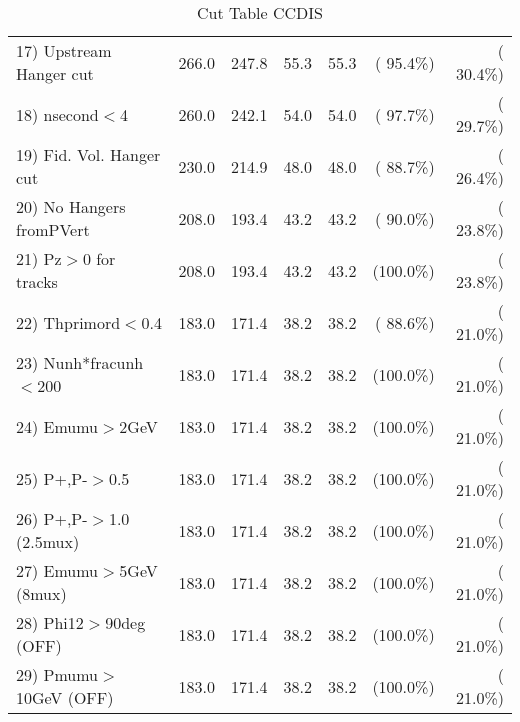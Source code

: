 \begin{table}[h!]
\begin{tabular}{||l||r|r|r|r|r|r||}
 17) Upstream Hanger cut  &        266.0 &        247.8 &         55.3 &         55.3 & ( 95.4\%) & ( 30.4\%) \\
 18) nsecond$<$4          &        260.0 &        242.1 &         54.0 &         54.0 & ( 97.7\%) & ( 29.7\%) \\
 19) Fid. Vol. Hanger cut &        230.0 &        214.9 &         48.0 &         48.0 & ( 88.7\%) & ( 26.4\%) \\
 20) No Hangers fromPVert &        208.0 &        193.4 &         43.2 &         43.2 & ( 90.0\%) & ( 23.8\%) \\
 21) Pz$>$0 for tracks    &        208.0 &        193.4 &         43.2 &         43.2 & (100.0\%) & ( 23.8\%) \\
 22) Thprimord$<$0.4      &        183.0 &        171.4 &         38.2 &         38.2 & ( 88.6\%) & ( 21.0\%) \\
 23) Nunh*fracunh$<$200   &        183.0 &        171.4 &         38.2 &         38.2 & (100.0\%) & ( 21.0\%) \\
 24) Emumu$>$2GeV         &        183.0 &        171.4 &         38.2 &         38.2 & (100.0\%) & ( 21.0\%) \\
 25) P+,P-$>$0.5          &        183.0 &        171.4 &         38.2 &         38.2 & (100.0\%) & ( 21.0\%) \\
 26) P+,P-$>$1.0 (2.5mux) &        183.0 &        171.4 &         38.2 &         38.2 & (100.0\%) & ( 21.0\%) \\
 27) Emumu$>$5GeV  (8mux) &        183.0 &        171.4 &         38.2 &         38.2 & (100.0\%) & ( 21.0\%) \\
 28) Phi12$>$90deg  (OFF) &        183.0 &        171.4 &         38.2 &         38.2 & (100.0\%) & ( 21.0\%) \\
 29) Pmumu$>$10GeV  (OFF) &        183.0 &        171.4 &         38.2 &         38.2 & (100.0\%) & ( 21.0\%) \\
 \hline
 \hline
 \end{tabular}
 \caption{Cut Table  CCDIS    }
 \label{tab-cutcohjpsi-mumu_ncdis}
 \end{table}
